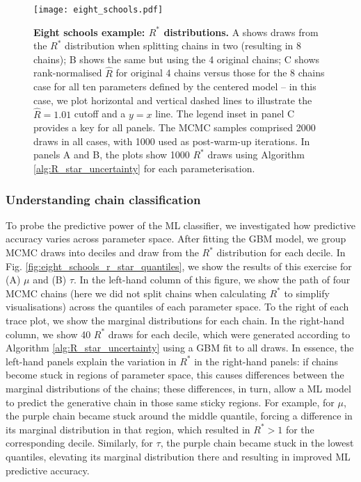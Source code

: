\documentclass{article}
\begin{document}
\begin{figure}[!htb]
	\centerline{\texttt{[image: eight\_schools.pdf]}}
	\caption{\textbf{Eight schools example: $R^*$ distributions.} A shows draws from the $R^*$ distribution when splitting chains in two (resulting in 8 chains); B shows the same but using the 4 original chains; C shows rank-normalised $\widehat{R}$ for original 4 chains versus those for the 8 chains case for all ten parameters defined by the centered model -- in this case, we plot horizontal and vertical dashed lines to illustrate the $\widehat{R}=1.01$ cutoff and a $y=x$ line. The legend inset in panel C provides a key for all panels. The MCMC samples comprised 2000 draws in all cases, with 1000 used as post-warm-up iterations. In panels A and B, the plots show 1000 $R^*$ draws using Algorithm \ref{alg:R_star_uncertainty} for each parameterisation.}
	\label{fig:eight_schools}
\end{figure}

\subsubsection{Understanding chain classification}
To probe the predictive power of the ML classifier, we investigated how predictive accuracy varies across parameter space. After fitting the GBM model, we group MCMC draws into deciles and draw from the $R^*$ distribution for each decile. In Fig. \ref{fig:eight_schools_r_star_quantiles}, we show the results of this exercise for (A) $\mu$ and (B) $\tau$. In the left-hand column of this figure, we show the path of four MCMC chains (here we did not split chains when calculating $R^*$ to simplify visualisations) across the quantiles of each parameter space. To the right of each trace plot, we show the marginal distributions for each chain. In the right-hand column, we show 40 $R^*$ draws for each decile, which were generated according to Algorithm \ref{alg:R_star_uncertainty} using a GBM fit to all draws. In essence, the left-hand panels explain the variation in $R^*$ in the right-hand panels: if chains become stuck in regions of parameter space, this causes differences between the marginal distributions of the chains; these differences, in turn, allow a ML model to predict the generative chain in those same sticky regions. For example, for $\mu$, the purple chain became stuck around the middle quantile, forcing a difference in its marginal distribution in that region, which resulted in $R^*>1$ for the corresponding decile. Similarly, for $\tau$, the purple chain became stuck in the lowest quantiles, elevating its marginal distribution there and resulting in improved ML predictive accuracy.
\end{document}
